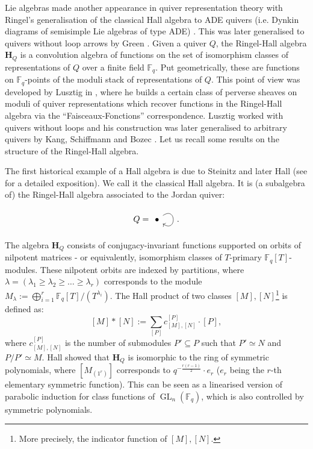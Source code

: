 \documentclass[11pt,english]{article}
\numberwithin{equation}{section}
\numberwithin{figure}{section}
\theoremstyle{definition}
\theoremstyle{plain}
\theoremstyle{remark}
\DeclareMathOperator{\GL}{GL}
\newcommand\FF{\mathbb{F}}
\begin{document}
Lie algebras made another appearance in quiver representation theory
with Ringel's generalisation of the classical Hall algebra to ADE
quivers (i.e. Dynkin diagrams of semisimple Lie algebras of type ADE)
\cite{Rin90a}. This was later generalised to quivers without loop
arrows by Green \cite{Gre95}. Given a quiver $Q$, the Ringel-Hall
algebra $\mathbf{H}_{Q}$ is a convolution algebra of functions on
the set of isomorphism classes of representations of $Q$ over a finite
field $\FF_{q}$. Put geometrically, these are functions on $\FF_{q}$-points
of the moduli stack of representations of $Q$. This point of view
was developed by Lusztig in \cite{Lus91}, where he builds a certain
class of perverse sheaves on moduli of quiver representations which
recover functions in the Ringel-Hall algebra via the ``Faisceaux-Fonctions''
correspondence. Lusztig worked with quivers without loops and his
construction was later generalised to arbitrary quivers by Kang, Schiffmann
\cite{KS06} and Bozec \cite{Boz15}. Let us recall some results on
the structure of the Ringel-Hall algebra. 

The first historical example of a Hall algebra is due to Steinitz
and later Hall (see \cite[Ch. II]{Mac95} for a detailed exposition).
We call it the classical Hall algebra. It is (a subalgebra of) the
Ringel-Hall algebra associated to the Jordan quiver:\[
Q=
\begin{tikzcd}[ampersand replacement=\&]
\bullet \arrow[loop, distance=2em, in=325, out=35]
\end{tikzcd}
.
\]The algebra $\mathbf{H}_{Q}$ consists of conjugacy-invariant functions
supported on orbits of nilpotent matrices - or equivalently, isomorphism
classes of $T$-primary $\FF_{q}[T]$-modules. These nilpotent orbits
are indexed by partitions, where $\lambda=(\lambda_{1}\geq\lambda_{2}\geq\ldots\geq\lambda_{r})$
corresponds to the module $M_{\lambda}:=\bigoplus_{i=1}^{r}\FF_{q}[T]/(T^{\lambda_{i}})$.
The Hall product of two classes $[M],[N]$\footnote{More precisely, the indicator function of $[M],[N]$.}
is defined as:\[
[M]*[N]:=\sum_{[P]}c_{[M],[N]}^{[P]}\cdot [P],
\]where $c_{[M],[N]}^{[P]}$ is the number of submodules $P'\subseteq P$
such that $P'\simeq N$ and $P/P'\simeq M$. Hall showed that $\mathbf{H}_{Q}$
is isomorphic to the ring of symmetric polynomials, where $[M_{(1^{r})}]$
corresponds to $q^{-\frac{r(r-1)}{2}}\cdot e_{r}$ ($e_{r}$ being
the $r$-th elementary symmetric function). This can be seen as a
linearised version of parabolic induction for class functions of $\GL_{n}(\FF_{q})$,
which is also controlled by symmetric polynomials.
\end{document}
